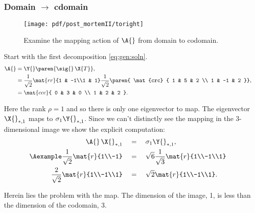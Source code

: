 \subsubsection{Domain $\longrightarrow$ cdomain}
\begin{figure}[htbp] %
   \centering
   \texttt{[image: pdf/post\_mortemII/toright]} 
   \caption[The mapping action of $\A{}$ from domain to codomain]{Examine the mapping action of $\A{}$ from domain to codomain.}
   \label{fig:toright}
\end{figure}

Start with the first decomposition \eqref{eq:gen:soln}.
\begin{equation}
  \begin{split}
    \A{} &= \Y{}\paren{\sig{}\,\X{T}},\\
     &=
  \frac{1}{\sqrt{2}}
  \mat{rr}{1 & -1\\1 & 1}
  \frac{1}{\sqrt{2}}
  \paren{
  \mat{crc}
  {
  1 & 5  & 2 \\
  1 & -1 & 2
  }}, \\
  &=
  \mat{ccc}
  {
  0 & 3 & 0 \\
  1 & 2 & 2
  }.
  \end{split}
  \label{eq:gen:soln}
\end{equation}

Here the rank $\rho=1$ and so there is only one eigenvector to map. The eigenvector $\X{}_{*,1}$ maps to $\sigma_{1}\Y{}_{*,1}$. Since we can't distinctly see the mapping in the 3-dimensional image we show the explicit computation:
\begin{equation}
  \begin{split}
    \A{}\,\X{}_{*,1}\quad &= \quad \sigma_{1}\Y{}_{*,1}, \\
    \Aexample \frac{1}{\sqrt{2}}\mat{r}{1\\-1} \quad & =  \quad \sqrt{6}\frac{1}{\sqrt{3}}\mat{r}{1\\-1\\1}\\
    \frac{2}{\sqrt{2}}\mat{r}{1\\-1\\1}  \quad & =  \quad \sqrt{2}\mat{r}{1\\-1\\1}.
  \end{split}
\end{equation}

Herein lies the problem with the map. The dimension of the image, 1, is less than the dimension of the codomain, 3.

